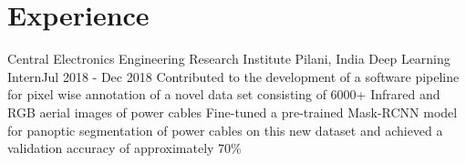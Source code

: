 \section{Experience}
\resumeSubHeadingListStart

\resumeHeadingFour
{Central Electronics Engineering Research Institute }{Pilani, India}
{Deep Learning Intern}{Jul 2018 - Dec 2018}
\resumeItemListStart
{}
{Contributed to the development of a software pipeline for pixel wise annotation of a novel data set consisting of 6000+ Infrared and RGB aerial images of power cables}
{Fine-tuned a pre-trained Mask-RCNN model for panoptic segmentation of power cables on this new dataset and achieved a validation accuracy of approximately 70\%}
\resumeItemListEnd

\resumeSubHeadingListEnd

